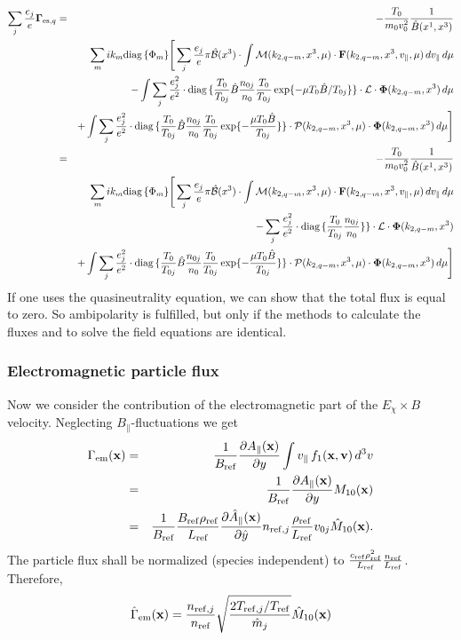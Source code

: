 \begin{eqnarray*}
  \sum_j\frac{e_j}{e}\mathbf{\Gamma}_{\mathrm{es},q} 
  &=&-\frac{T_0}{m_0v_0^2}\frac{1}{\hat{B}(x^1,x^3)}\\
  &&\sum_m ik_m\mbox{diag}\,\{\Phi_m\} \Bigg[
  \sum_j\frac{e_j}{e}\pi\hat{\mathcal{B}}(x^3)\cdot \int\mathcal{M}(k_{2,q-m},x^3,\mu)\cdot\mathbf{F}(k_{2,q-m},x^3,v_\|,\mu)\,dv_\|\,d\mu\\
  &&-\int \sum_j\frac{e_j^2}{e^2}
  \cdot\mbox{diag}\,\{\frac{T_0}{T_{0j}}\hat{B}\frac{n_{0j}}{n_0}\frac{T_0}{T_{0j}}\exp\{-\mu T_0\hat{B}/T_{0j}\}\}
  \cdot\mathcal{L}\cdot\mathbf{\Phi}(k_{2,q-m},x^3)\,d\mu\\
  &&+\int\sum_j\frac{e_j^2}{e^2}
  \cdot\mbox{diag}\,\{\frac{T_0}{T_{0j}}\hat{B}\frac{n_{0j}}{n_0}\frac{T_0}{T_{0j}}\exp\{-\frac{\mu T_0\hat{B}}{T_{0j}}\}\}
  \cdot\mathcal{P}(k_{2,q-m},x^3,\mu)\cdot\mathbf{\Phi}(k_{2,q-m},x^3) \,d\mu
  \Bigg]\\
  &=&-\frac{T_0}{m_0v_0^2}\frac{1}{\hat{B}(x^1,x^3)}\\
  &&\sum_m ik_m\mbox{diag}\,\{\Phi_m\} \Bigg[
  \sum_j\frac{e_j}{e}\pi\hat{\mathcal{B}}(x^3)\cdot \int\mathcal{M}(k_{2,q-m},x^3,\mu)\cdot\mathbf{F}(k_{2,q-m},x^3,v_\|,\mu)\,dv_\|\,d\mu\\
  &&-\sum_j\frac{e_j^2}{e^2}
  \cdot\mbox{diag}\,\{\frac{T_0}{T_{0j}}\frac{n_{0j}}{n_0}\}\}
  \cdot\mathcal{L}\cdot\mathbf{\Phi}(k_{2,q-m},x^3)\\
  &&+\int\sum_j\frac{e_j^2}{e^2}
  \cdot\mbox{diag}\,\{\frac{T_0}{T_{0j}}\hat{B}\frac{n_{0j}}{n_0}\frac{T_0}{T_{0j}}\exp\{-\frac{\mu T_0\hat{B}}{T_{0j}}\}\}
  \cdot\mathcal{P}(k_{2,q-m},x^3,\mu)\cdot\mathbf{\Phi}(k_{2,q-m},x^3) \,d\mu
  \Bigg]
\end{eqnarray*}
If one uses the quasineutrality equation, we can show that the total
flux is equal to zero. So ambipolarity is fulfilled, but only if the
methods to calculate the fluxes and to solve the field equations are
identical.

\subsubsection{Electromagnetic particle flux}
Now we consider the contribution of the electromagnetic part of the $E_\chi\times B$ velocity.
Neglecting $B_\|$-fluctuations we get
\begin{eqnarray*}
\Gamma_\mathrm{em}(\mathbf{x})&=&\frac{1}{B_{\mathrm{ref}}}\frac{\partial A_\|(\mathbf{x})}{\partial y}
  \int v_\| \, f_1(\mathbf{x},\mathbf{v})\,d^3v\\
&=&\frac{1}{B_{\mathrm{ref}}}\frac{\partial A_\|(\mathbf{x})}{\partial y} M_{10}(\mathbf{x})\\
&=&\frac{1}{B_{\mathrm{ref}}}\frac{B_{\mathrm{ref}}\rho_{\mathrm{ref}}}{L_{\mathrm{ref}}}\frac{\partial \hat{A}_\|(\mathbf{x})}{\partial \hat{y}}
 n_{\mathrm{ref},j} \frac{\rho_{\mathrm{ref}}}{L_{\mathrm{ref}}} v_{0j} \hat{M}_{10}(\mathbf{x}).
\end{eqnarray*}
The particle flux shall be normalized (species independent) to 
$\frac{c_{\mathrm{ref}} \rho_{\mathrm{ref}}^2}{L_{\mathrm{ref}}}\frac{n_{\mathrm{ref}}}{L_{\mathrm{ref}}}$. Therefore,
\begin{equation}
\hat{\Gamma}_\mathrm{em}(\mathbf{x})=\frac{n_{\mathrm{ref},j}}{n_{\mathrm{ref}}}
 \sqrt{\frac{2T_{\mathrm{ref},j}/T_{\mathrm{ref}}}{\hat{m}_j}}\hat{M}_{10}(\mathbf{x})
\label{eq:Gem_norm}
\end{equation}


